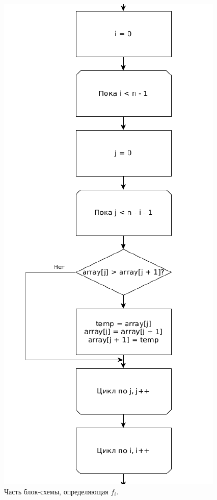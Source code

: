 \documentclass[12pt]{report}
\begin{document}
\begin{figure}
\begin{center}
\includegraphics[scale=0.5]{inc/img/bubblefi.png}
\captionsetup{justification=centering}
	\caption{Часть блок-схемы, определяющая $f_{i}$.}
	\label{img:bubble:fi}	
\end{center}
\end{figure}
\newpage 
\end{document}

